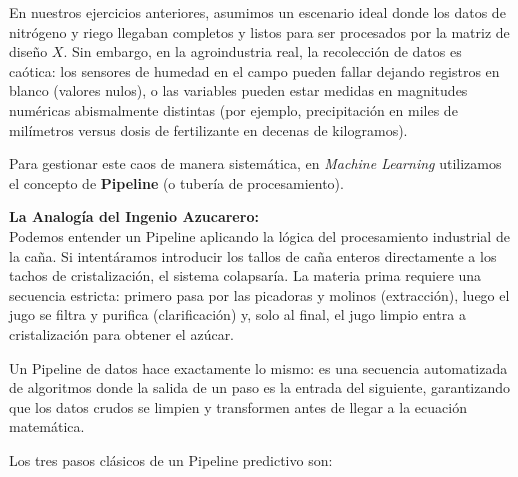 \documentclass{article}
\begin{document}
En nuestros ejercicios anteriores, asumimos un escenario ideal donde los datos de nitrógeno y riego llegaban completos y listos para ser procesados por la matriz de diseño $X$. Sin embargo, en la agroindustria real, la recolección de datos es caótica: los sensores de humedad en el campo pueden fallar dejando registros en blanco (valores nulos), o las variables pueden estar medidas en magnitudes numéricas abismalmente distintas (por ejemplo, precipitación en miles de milímetros versus dosis de fertilizante en decenas de kilogramos).

Para gestionar este caos de manera sistemática, en \textit{Machine Learning} utilizamos el concepto de \textbf{Pipeline} (o tubería de procesamiento). 

\textbf{La Analogía del Ingenio Azucarero:} \\
Podemos entender un Pipeline aplicando la lógica del procesamiento industrial de la caña. Si intentáramos introducir los tallos de caña enteros directamente a los tachos de cristalización, el sistema colapsaría. La materia prima requiere una secuencia estricta: primero pasa por las picadoras y molinos (extracción), luego el jugo se filtra y purifica (clarificación) y, solo al final, el jugo limpio entra a cristalización para obtener el azúcar. 

Un Pipeline de datos hace exactamente lo mismo: es una secuencia automatizada de algoritmos donde la salida de un paso es la entrada del siguiente, garantizando que los datos crudos se limpien y transformen antes de llegar a la ecuación matemática.



Los tres pasos clásicos de un Pipeline predictivo son:
\end{document}

